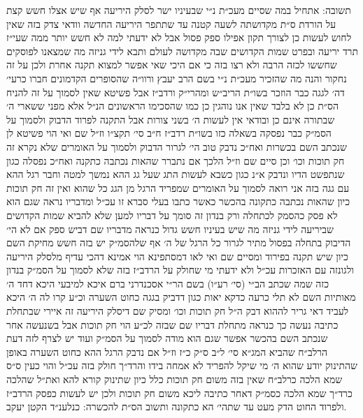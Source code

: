 \documentclass[12pt, openany]{book}
\begin{document}
\begin{multicols}{2}
תשובה: אתחיל במה שסיים מעכ״ת נ״י שבעיניו ישר לסלק היריעה אף שיש אצלו חשש קצת על הורדת ס״ת מקדושתה לשעה קטנה עד שתתפר היריעה החדשה וודאי צדק בזה שאין לחוש לעשות כן לצורך תקון אפילו ספק פסול אבל לא ידעתי למה לא חשש יותר ממה שעי״ז תרד יריעה ובפרט שמות הקדושים שבה מקדושה לעולם ותבא לידי גניזה מה שמצאנו לפוסקים שחששו לכזה הרבה ולא רצו בזה כי אם היכי שאי אפשר למצוא תקנה אחרת ולכן על זה נחקור והנה מה שהזכיר מעכ״ת נ״י בשם הרב יעבץ ורוו״ה שהסופרים הקדמונים חברו כרעי׳ דה׳ לגגה כבר הוזכר בשו״ת הריב״ש ומהרי״ק ורדב״ז אבל פשיטא שאין לסמוך על זה להניח הס״ת כן לא בלבד שאין אנו נוהגין כן כמו שהסכימו הראשונים הנ״ל אלא מפני ששארי ה׳ שבתורה אינם כן ובודאי אין לעשות ה׳ בשני צורות אבל התקנה לפרוד הדבוק ולסמוך על הסמ״ק כבר נפסקה בשאלה כזו בשו״ת רדב״ז ח״ב סי׳ תקצ״ו וז״ל שם ואי הוי פשיטא לן שנכתב השם בכשרות ואח״כ נדבק טוב הי׳ לגרור הדבוק ולסמוך על האומרים שלא נקרא זה חק תוכות וכו׳ וכן סיים שם וז״ל הלכך אם נתברר שהאות נכתבה כתקנה ואח״כ נפסלה כגון שנתפשט הדיו ונדבק א״נ כגון כשבא לעשות התג שעל גג ההא נמשך למטה וחבר רגל ההא עם גגה בזה אני רואה לסמוך על האומרים שמפריד הרגל מן הגג כל שהוא ואין זה חק תוכות כיון שהאות נכתבה כתקונה בהכשר כאשר כתבו בעלי סברא זו עכ״ל ומדבריו נראה שגם הוא לא פסק כהסמק לכתחלה ורק בנדון זה סומך על דבריו למען שלא להביא שמות הקדושים שביריעה לידי גניזה מה שיש בעיניו חשש גדול כנראה מדבריו שם דביש ספק אם לא הי׳ הדיבוק בתחלה בפסול מתיר לגרור כל הרגל של ה׳ אף שלהסמ״ק יש בזה חשש מחיקת השם כיון שיש תקנה בפירוד ומסיים שם ואי לאו דמסתפינא הוי אמינא דהכי עדיף מלסלק היריעה ולגונזה עם האזכרות עכ״ל ולא ידעתי מי שחולק על הרדב״ז בזה שלא לסמוך על הסמ״ק בנדון כזה שמה שכתב הב״י (סי׳ רע״ו) בשם הר״י אסכנדרני ברם איכא למיבעי היכא דחד ה׳ מאותיות השם לא תלי כרעה כדקא יאות כגון דדביק בגגה כחוט השערה וכ״ע קרו לה ה׳ היכא לעביד דאי גריר לההוא דבק ה״ל חק תוכות וכו׳ ומסיק שם דיסלק היריעה זה איירי שבתחלת כתיבה נעשה כך כנראה מתחלת דבריו שם שבזה לכ״ע הוי חק תוכות אבל בשנעשה אחר שנכתב השם בהכשר אפשר שגם הוא מודה לסמוך על הסמ״ק ועוד יש לצרף לזה דעת הרלב״ח שהביא המג״א סי׳ ל״ב ס״ק כ״ז וז״ל אם נדבק הרגל ההא כחוט השערה באופן שהתינוק יודע שהוא ה׳ מי שיקל להפריד לא אמחה בידו והרד״ך חולק בזה עכ״ל והוי כעין ס״ס שמא הלכה כרלב״ח שאין בזה משום חק תוכות כלל כיון שתינוק קורא להא ואת״ל שהלכה כרד״ך שמא הלכה כסמ״ק דאחר כתיבה ליכא משום חק תוכות ולכן יש לעשות כפסק הרדב״ז ולפרוד החוט הדק מעט עד שתהי׳ הא כתקונה ותשוב הס״ת להכשרה: כנלענ״ד הקטן יעקב.\\\vspace{0pt}

\end{multicols}\newpage
\end{document}
